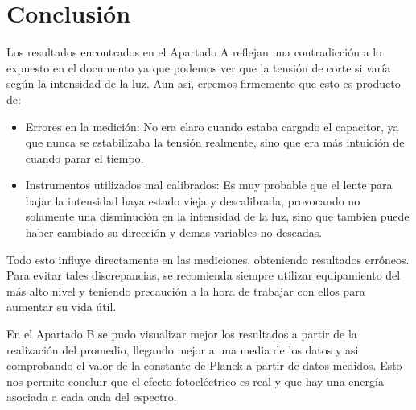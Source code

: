 \documentclass[a4paper,12pt]{report}
\begin{document}
\chapter{Conclusión}

    Los resultados encontrados en el Apartado A reflejan una contradicción a lo expuesto en el documento ya que podemos
  ver que la tensión de corte si varía según la intensidad de la luz. Aun asi, creemos firmemente que esto es producto 
  de:
    \begin{itemize}
      \item Errores en la medición: No era claro cuando estaba cargado el capacitor, ya que nunca se estabilizaba la
      tensión realmente, sino que era más intuición de cuando parar el tiempo.
      \item Instrumentos utilizados mal calibrados: Es muy probable que el lente para bajar la intensidad haya estado
      vieja y descalibrada, provocando no solamente una disminución en la intensidad de la luz, sino que tambien
      puede haber cambiado su dirección y demas variables no deseadas.
    \end{itemize}
  Todo esto influye directamente en las mediciones, obteniendo resultados erróneos. Para evitar tales discrepancias,
  se recomienda siempre utilizar equipamiento del más alto nivel y teniendo precaución a la hora de trabajar con ellos
  para aumentar su vida útil.

  En el Apartado B se pudo visualizar mejor los resultados a partir de la realización del promedio, llegando mejor
  a una media de los datos y asi comprobando el valor de la constante de Planck a partir de datos medidos. Esto nos
  permite concluir que el efecto fotoeléctrico es real y que hay una energía asociada a cada onda del espectro.
\end{document}
